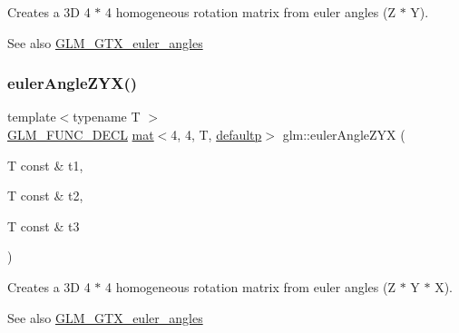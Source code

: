 Creates a 3D 4 $\ast$ 4 homogeneous rotation matrix from euler angles (Z $\ast$ Y). \begin{DoxySeeAlso}{See also}
\hyperlink{group__gtx__euler__angles}{G\+L\+M\+\_\+\+G\+T\+X\+\_\+euler\+\_\+angles} 
\end{DoxySeeAlso}
\mbox{\label{group__gtx__euler__angles_ga2e61f1e39069c47530acab9167852dd6}} 
\subsubsection{\texorpdfstring{euler\+Angle\+Z\+Y\+X()}{eulerAngleZYX()}}
{\footnotesize\ttfamily template$<$typename T $>$ \\
\hyperlink{setup_8hpp_ab2d052de21a70539923e9bcbf6e83a51}{G\+L\+M\+\_\+\+F\+U\+N\+C\+\_\+\+D\+E\+CL} \hyperlink{structglm_1_1mat}{mat}$<$4, 4, T, \hyperlink{namespaceglm_a36ed105b07c7746804d7fdc7cc90ff25a9d21ccd8b5a009ec7eb7677befc3bf51}{defaultp}$>$ glm\+::euler\+Angle\+Z\+YX (\begin{DoxyParamCaption}\item[{T const \&}]{t1,  }\item[{T const \&}]{t2,  }\item[{T const \&}]{t3 }\end{DoxyParamCaption})}

Creates a 3D 4 $\ast$ 4 homogeneous rotation matrix from euler angles (Z $\ast$ Y $\ast$ X). \begin{DoxySeeAlso}{See also}
\hyperlink{group__gtx__euler__angles}{G\+L\+M\+\_\+\+G\+T\+X\+\_\+euler\+\_\+angles} 
\end{DoxySeeAlso}
\mbox{\label{group__gtx__euler__angles_gacd795f1dbecaf74974f9c76bbcca6830}} 
